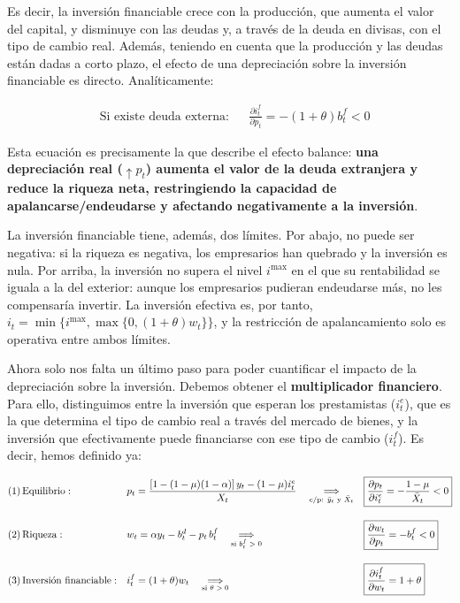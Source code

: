 \documentclass[10pt,a4paper]{article}
\begin{document}
Es decir, la inversión financiable crece con la producción, que aumenta el valor del capital, y disminuye con las deudas y, a través de la deuda en divisas, con el tipo de cambio real. Además, teniendo en cuenta que la producción y las deudas están dadas a corto plazo, el efecto de una depreciación sobre la inversión financiable es directo. Analíticamente:

$$\begin{aligned}
  &\text{Si existe deuda externa}: &&\boxed{\frac{\partial i_t^f}{\partial p_t}=-(1+\theta)b_t^f<0}
\end{aligned}$$

Esta ecuación es precisamente la que describe el efecto balance: \textbf{una depreciación real ($\uparrow p_t$) aumenta el valor de la deuda extranjera y reduce la riqueza neta, restringiendo la capacidad de apalancarse/endeudarse y afectando negativamente a la inversión}.

La inversión financiable tiene, además, dos límites. Por abajo, no puede ser negativa: si la riqueza es negativa, los empresarios han quebrado y la inversión es nula. Por arriba, la inversión no supera el nivel $i^{\max}$ en el que su rentabilidad se iguala a la del exterior: aunque los empresarios pudieran endeudarse más, no les compensaría invertir. La inversión efectiva es, por tanto, $i_t=\min\{i^{\max},\max\{0,(1+\theta)w_t\}\}$, y la restricción de apalancamiento solo es operativa entre ambos límites.

Ahora solo nos falta un último paso para poder cuantificar el impacto de la depreciación sobre la inversión. Debemos obtener el \textbf{multiplicador financiero}. Para ello, distinguimos entre la inversión que esperan los prestamistas ($i_t^e$), que es la que determina el tipo de cambio real a través del mercado de bienes, y la inversión que efectivamente puede financiarse con ese tipo de cambio ($i_t^f$). Es decir, hemos definido ya:

$$\begin{aligned}
  &(1)\,\text{Equilibrio}:&&p_t=\frac{\left[1-(1-\mu)(1-\alpha)\right]y_t-(1-\mu)i_t^e}{X_t}\quad\underset{\text{\scriptsize c/p: $\bar y_t$ y $\bar X_t$}}{\Longrightarrow}&&\boxed{\frac{\partial p_t}{\partial i_t^e}=-\frac{1-\mu}{\bar X_t}<0}\\[1em]
  &(2)\,\text{Riqueza}:&&w_t=\alpha y_t-b_t^d-p_t\,b_t^f\quad \underset{\text{\scriptsize si $b_t^f>0$}}{\Longrightarrow}&&\boxed{\frac{\partial w_t}{\partial p_t}=-b_t^f<0}\\[1em]
  &(3)\,\text{Inversión financiable}:&&i_t^f=(1+\theta)w_t\quad\underset{\text{\scriptsize si $\theta>0$}}{\Longrightarrow}&&\boxed{\frac{\partial i_t^f}{\partial w_t}=1+\theta}
\end{aligned}$$
\end{document}
